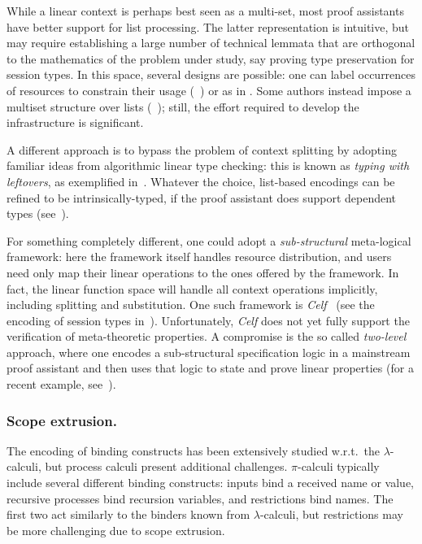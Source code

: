 \documentclass[runningheads]{llncs}
\begin{document}
While a linear context is perhaps best seen as a multi-set, most proof assistants have better support for list processing.
The latter representation is intuitive, but may require establishing a large number of technical lemmata that are orthogonal to the mathematics of the problem under study, say proving type preservation for session types.
In this space, several designs are possible: one can label occurrences of resources to constrain their usage (\eg~\cite{CicconeP20}) or  as in \cite{Castro2020}.
Some authors instead impose a multiset structure over lists (\eg~\cite{ChaudhuriLR19,Danielsson12}); still, the effort required to develop the infrastructure is significant.

A different approach is to bypass the problem of context splitting by adopting familiar ideas from algorithmic linear type checking: this is known as \emph{typing with leftovers}, as exemplified in~\cite{DBLP:conf/forte/ZalakainD21}.
Whatever the choice, list-based encodings can be refined to be intrinsically-typed, if the proof assistant does support dependent types (see~\cite{Thiemann2019,CicconeP20,RouvoetPKV20}).

For something completely different, one could adopt a \emph{sub-structural} meta-logical framework: here the framework itself handles resource distribution, and users need only map their linear operations to the ones offered by the framework.
In fact, the linear function space will handle all context operations implicitly, including splitting and substitution.
One such framework is \emph{Celf}~\cite{Schack-Nielsen:IJCAR08} (see the encoding of session types in~\cite{Bock2016}).
Unfortunately, \emph{Celf} does not yet fully support the verification of meta-theoretic properties.
A compromise is the so called \emph{two-level} approach, where one encodes a sub-structural specification logic in a mainstream proof assistant and then uses that logic to state and prove linear properties (for a recent example, see~\cite{Felty:MSCS21}).

\subsubsection{Scope extrusion.}
The encoding of binding constructs has been extensively studied
w.r.t.\ the $\lambda$-calculi, but process calculi present additional
challenges.  $\pi$-calculi typically include several different binding
constructs: inputs bind a received name or value, recursive processes
bind recursion variables, and restrictions bind names.  The first two
act similarly to the binders known from $\lambda$-calculi, but
restrictions may be more challenging due to scope extrusion.
\end{document}
